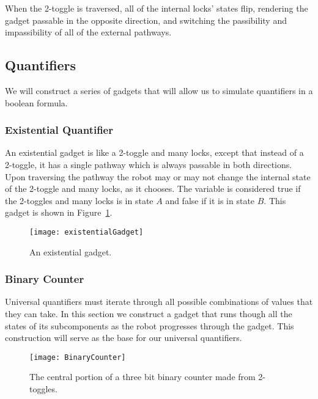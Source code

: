 When the 2-toggle is traversed, all of the internal locks' states flip, rendering the gadget passable in the opposite direction, and switching the passibility and impassibility of all of the external pathways.

\subsection{Quantifiers}

We will construct a series of gadgets that will allow us to simulate quantifiers in a boolean formula.

\subsubsection{Existential Quantifier}
An existential gadget is like a 2-toggle and many locks, except that instead of a
2-toggle, it has a single pathway which is always passable in both directions. Upon traversing the pathway
the robot may or may not change the internal state of the 2-toggle and many locks, as it chooses. The variable is 
considered true if the 2-toggles and many locks is in state $A$ and false if it is in state $B$. This gadget
is shown in Figure~\ref{fig:Existential}.

\begin{figure}[h!]
\centering
    \texttt{[image: existentialGadget]}
    \caption{An existential gadget.} %
    \label{fig:Existential}
\end{figure}

\subsubsection{Binary Counter}

Universal quantifiers must iterate through all possible combinations of values that they can take. In this section we construct a gadget that runs though all the states of its subcomponents as the robot progresses through the gadget. This construction will serve as the base for our universal quantifiers.

\begin{figure}[h!]
\centering
    \texttt{[image: BinaryCounter]}
    \caption{The central portion of a three bit binary counter made from 2-toggles.}
    \label{fig:BinaryCounter}
\end{figure}
  
